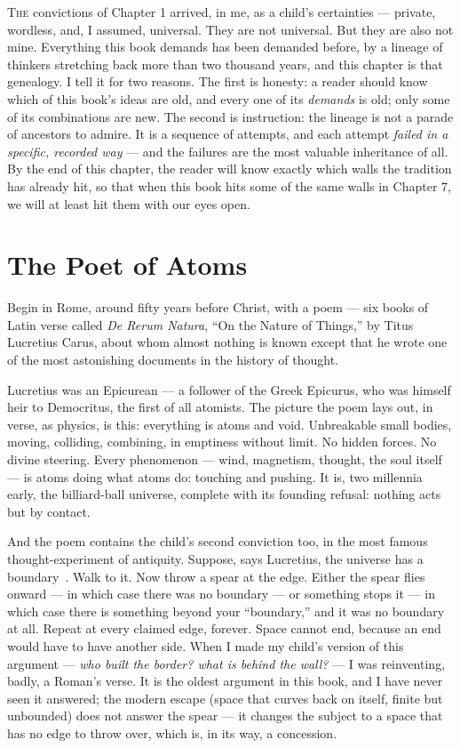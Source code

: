 \documentclass[fontsize=11pt,paper=a4,pagesize=auto,parskip=half-]{scrbook}
\newcommand{\Iy}[1]{#1\index{#1}}
\begin{document}
\lettrine{T}{he} convictions of Chapter 1 arrived, in me, as a child's certainties --- private, wordless, and, I assumed, universal. They are not universal. But they are also not mine. Everything this book demands has been demanded before, by a lineage of thinkers stretching back more than two thousand years, and this chapter is that genealogy. I tell it for two reasons. The first is honesty: a reader should know which of this book's ideas are old, and every one of its \emph{demands} is old; only some of its combinations are new. The second is instruction: the lineage is not a parade of ancestors to admire. It is a sequence of attempts, and each attempt \emph{failed in a specific, recorded way} --- and the failures are the most valuable inheritance of all. By the end of this chapter, the reader will know exactly which walls the tradition has already hit, so that when this book hits some of the same walls in Chapter 7, we will at least hit them with our eyes open.

\section{The Poet of Atoms}

Begin in Rome, around fifty years before Christ, with a poem --- six books of Latin verse called \emph{De Rerum Natura}, ``On the Nature of Things,'' by Titus Lucretius Carus, about whom almost nothing is known except that he wrote one of the most astonishing documents in the history of thought.

Lucretius was an Epicurean --- a follower of the Greek \Iy{Epicurus}, who was himself heir to \Iy{Democritus}, the first of all atomists. The picture the poem lays out, in verse, as physics, is this: everything is atoms and void. Unbreakable small bodies, moving, colliding, combining, in emptiness without limit. No hidden forces. No divine steering. Every phenomenon --- wind, magnetism, thought, the soul itself --- is atoms doing what atoms do: touching and pushing. It is, two millennia early, the billiard-ball universe, complete with its founding refusal: nothing acts but by contact.

And the poem contains the child's second conviction too, in the most famous thought-experiment of antiquity. Suppose, says Lucretius, the universe has a boundary~\cite[I.967--982]{lucretius}. Walk to it. Now throw a spear at the edge. Either the spear flies onward --- in which case there was no boundary --- or something stops it --- in which case there is something beyond your ``boundary,'' and it was no boundary at all. Repeat at every claimed edge, forever. Space cannot end, because an end would have to have another side. When I made my child's version of this argument --- \emph{who built the border? what is behind the wall?} --- I was reinventing, badly, a Roman's verse. It is the oldest argument in this book, and I have never seen it answered; the modern escape (space that curves back on itself, finite but unbounded) does not answer the spear --- it changes the subject to a space that has no edge to throw over, which is, in its way, a concession.
\end{document}
